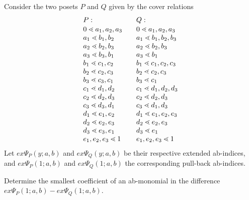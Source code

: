Consider the two posets $P$ and $Q$ given by the cover relations
\[
\begin{array}{l@{\qquad}l}
P: & Q:\\[0.3ex]
0\lessdot a_1,a_2,a_3 & 0\lessdot a_1,a_2,a_3\\
a_1\lessdot b_1,b_2 & a_1\lessdot b_1,b_2,b_3\\
a_2\lessdot b_2,b_3 & a_2\lessdot b_2,b_3\\
a_3\lessdot b_3,b_1 & a_3\lessdot b_1\\
b_1\lessdot c_1,c_2 & b_1\lessdot c_1,c_2,c_3\\
b_2\lessdot c_2,c_3 & b_2\lessdot c_2,c_3\\
b_3\lessdot c_3,c_1 & b_3\lessdot c_1\\
c_1\lessdot d_1,d_2 & c_1\lessdot d_1,d_2,d_3\\
c_2\lessdot d_2,d_3 & c_2\lessdot d_2,d_3\\
c_3\lessdot d_3,d_1 & c_3\lessdot d_1,d_3\\
d_1\lessdot e_1,e_2 & d_1\lessdot e_1,e_2,e_3\\
d_2\lessdot e_2,e_3 & d_2\lessdot e_2,e_3\\
d_3\lessdot e_3,e_1 & d_3\lessdot e_1\\
e_1,e_2,e_3 \lessdot 1 & e_1,e_2,e_3 \lessdot 1
\end{array}
\]
Let $\mathit{ex}\Psi_P(y;a,b)$ and $\mathit{ex}\Psi_Q(y;a,b)$ be their respective extended ab-indices, and $\mathit{ex}\Psi_P(1;a,b)$ and $\mathit{ex}\Psi_Q(1;a,b)$ the corresponding pull-back ab-indices.

Determine the smallest coefficient of an ab-monomial in the difference $\mathit{ex}\Psi_P(1;a,b) - \mathit{ex}\Psi_Q(1;a,b)$.
